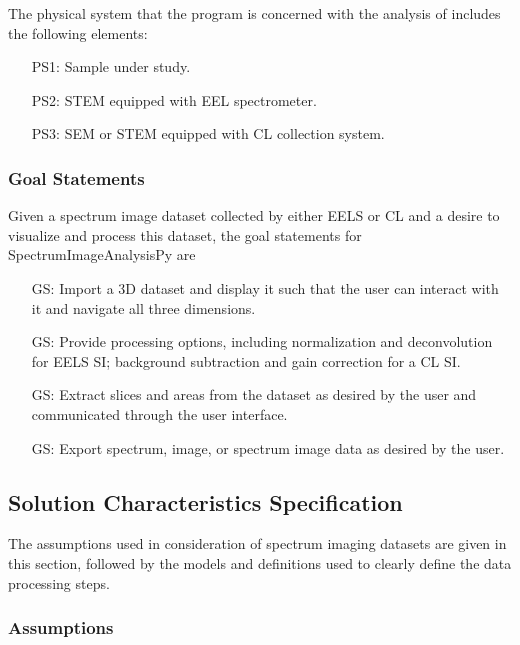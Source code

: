 \documentclass[12pt]{article}
\newcounter{goalnum} %
\newcommand{\progname}{SpectrumImageAnalysisPy} %
\begin{document}
The physical system that the program is concerned with the analysis of includes
the following elements:

\begin{itemize}
	\item[PS1:] Sample under study.
	\item[PS2:] STEM equipped with EEL spectrometer.
	\item[PS3:] SEM or STEM equipped with CL collection system.
\end{itemize}

\subsubsection{Goal Statements}

\noindent Given a spectrum image dataset collected by either EELS or CL and a
desire to visualize and process this dataset, the goal statements for
\progname{} are

\begin{itemize}
	\item[GS\refstepcounter{goalnum}\thegoalnum \label{G_ImportDisplay}:] Import a
3D dataset and display it such that the user can interact with it and navigate
all three dimensions.
	\item[GS\refstepcounter{goalnum}\thegoalnum \label{G_Processing}:] Provide
processing options, including normalization and deconvolution for EELS SI;
background subtraction and gain correction for a CL SI.
	\item[GS\refstepcounter{goalnum}\thegoalnum \label{G_Extraction}:] Extract
slices and areas from the dataset as desired by the user and communicated
through the user interface.
    \item[GS\refstepcounter{goalnum}\thegoalnum \label{G_Export}:] Export
    spectrum, image, or spectrum image data as desired by the user.
\end{itemize}


\subsection{Solution Characteristics Specification}

The assumptions used in consideration of spectrum imaging datasets are given in
this section, followed by the models and definitions used to clearly define the
data processing steps.

\subsubsection{Assumptions}\label{sssec:Assumptions}
\end{document}
